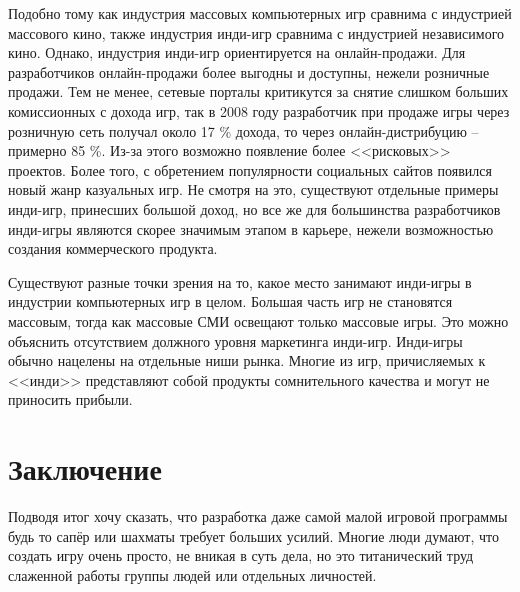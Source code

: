 Подобно тому как индустрия массовых компьютерных игр сравнима с индустрией массового кино, также
индустрия инди-игр сравнима с индустрией независимого кино\cite{2.13,2.34}. Однако, индустрия инди-игр
ориентируется на онлайн-продажи\cite{2.34}. Для разработчиков онлайн-продажи более выгодны\cite{2.20} и 
доступны, нежели розничные продажи. Тем не менее, сетевые порталы критикутся за снятие слишком больших 
комиссионных с дохода игр\cite{2.15}, так в 2008 году разработчик при продаже игры через розничную сеть 
получал около 17 \% дохода, то через онлайн-дистрибуцию -- примерно 85 \%\cite{2.20}. Из-за этого возможно 
появление более <<рисковых>> проектов\cite{2.20}. Более того, с обретением популярности социальных сайтов 
появился новый жанр казуальных игр\cite{2.5}. Не смотря на это, существуют отдельные примеры инди-игр, 
принесших большой доход, но все же для большинства разработчиков инди-игры являются скорее значимым этапом в 
карьере, нежели возможностью создания коммерческого продукта.

Существуют разные точки зрения на то, какое место занимают инди-игры в индустрии компьютерных игр в
целом\cite{2.16}. Большая часть игр не становятся массовым, тогда как массовые СМИ освещают только массовые
игры\cite{2.36,2.5}. Это можно объяснить отсутствием должного уровня маркетинга инди-игр\cite{2.36}. 
Инди-игры обычно нацелены на отдельные ниши рынка\cite{2.19}. Многие из игр, причисляемых к <<инди>> 
представляют собой продукты сомнительного качества и могут не приносить прибыли\cite{2.7}.

\chapter{Заключение}
Подводя итог хочу сказать, что разработка даже самой малой игровой программы будь то сапёр или шахматы 
требует больших усилий. Многие люди думают, что создать игру очень просто, не вникая в суть дела, но это 
титанический труд слаженной работы группы людей или отдельных личностей. 

